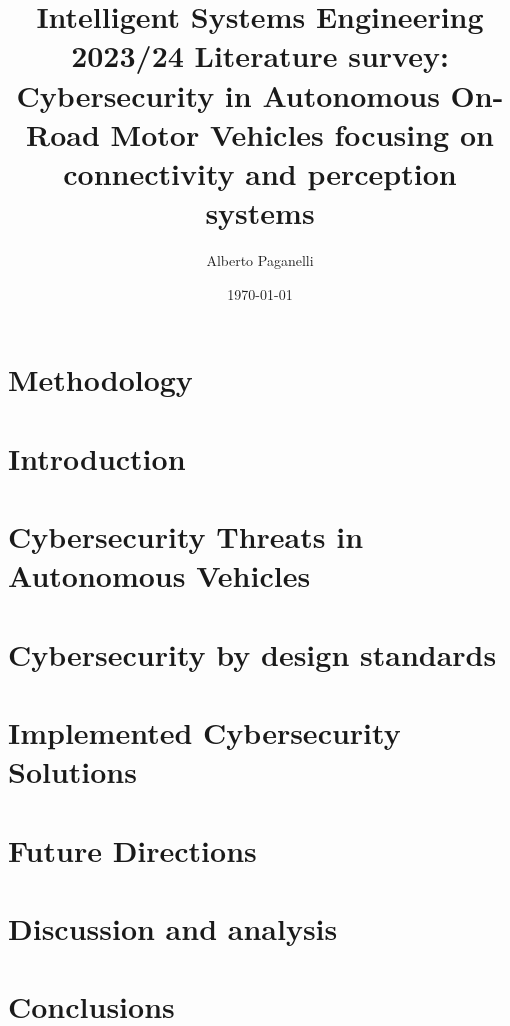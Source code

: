 \documentclass{scrartcl}
\title{\LARGE
Intelligent Systems Engineering 2023/24 \newline
\newline
Literature survey: \\
Cybersecurity in Autonomous On-Road Motor Vehicles focusing on connectivity and perception systems
}
\author{
    Alberto Paganelli \\ \emailaddr{alberto.paganelli3@studio.unibo.it}
}
\date{\today}
\begin{document}
    \maketitle
    \begin{abstract}
    
    \end{abstract}

    \newpage
    \tableofcontents
    \newpage

    \section{Methodology}\label{sec:methodology}
    

    \section{Introduction}\label{sec:introduction}
    

    \section{Cybersecurity Threats in Autonomous Vehicles}\label{sec:cybersecurity-threats-in-autonomous-vehicles}
    

    \section{Cybersecurity by design standards}\label{sec:cybersecurity-by-design-standards}
    

    \section{Implemented Cybersecurity Solutions}\label{sec:implemented-cybersecurity-solutions}
    

    \section{Future Directions}\label{sec:future-directions}
    

    \section{Discussion and analysis}\label{sec:discussion-and-analysis}
    

    \section{Conclusions}\label{sec:conclusions}
    

    ~\nocite{*}
    
    
\end{document}
